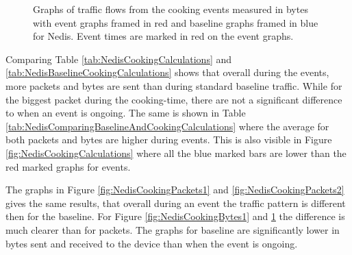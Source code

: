 \begin{figure}[H]
\begin{subfigure}[b]{0.47\textwidth}
    \end{subfigure}
        \begin{subfigure}[b]{0.47\textwidth}
        \centering
    \end{subfigure}
    \begin{subfigure}[b]{0.47\textwidth}
        \centering
    \end{subfigure}
    \begin{subfigure}[b]{0.47\textwidth}
        \centering
    \end{subfigure}
    \hspace{0.6cm}
    \begin{subfigure}[b]{0.47\textwidth}
    \centering
        \end{subfigure}
    \caption{Graphs of traffic flows from the cooking events measured in bytes with event graphs framed in red and baseline graphs framed in blue for Nedis. Event times are marked in red on the event graphs.} 
    \label{fig:NedisCookingBytes2}
\end{figure}

Comparing Table \ref{tab:NedisCookingCalculations} and \ref{tab:NedisBaselineCookingCalculations} shows that overall during the events, more packets and bytes are sent than during standard baseline traffic. While for the biggest packet during the cooking-time, there are not a significant difference to when an event is ongoing. The same is shown in Table \ref{tab:NedisComparingBaselineAndCookingCalculations} where the average for both packets and bytes are higher during events. This is also visible in Figure \ref{fig:NedisCookingCalculations} where all the blue marked bars are lower than the red marked graphs for events. 

The graphs in Figure \ref{fig:NedisCookingPackets1} and \ref{fig:NedisCookingPackets2} gives the same results, that overall during an event the traffic pattern is different then for the baseline. For Figure \ref{fig:NedisCookingBytes1} and \ref{fig:NedisCookingBytes2} the difference is much clearer than for packets. The graphs for baseline are significantly lower in bytes sent and received to the device than when the event is ongoing. 

